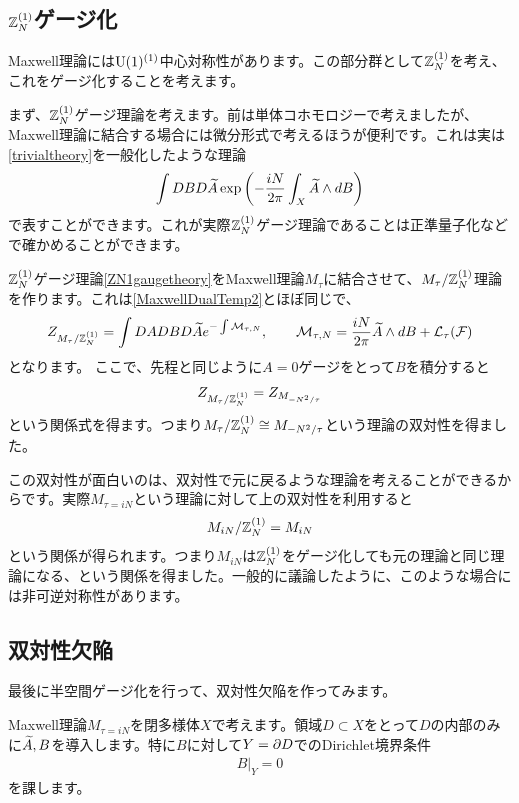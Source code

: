 \documentclass[generalized_symmetry.tex]{subfiles}
\begin{document}
\subsection{\texorpdfstring{$\mathbb{Z}_{N}^{(1)}$}{ZN1}ゲージ化}

Maxwell理論には$\mbox{U}(1)^{(1)}$中心対称性があります。この部分群として$\mathbb{Z}_N^{(1)}$を考え、これをゲージ化することを考えます。

まず、$\mathbb{Z}_N^{(1)}$ゲージ理論を考えます。前は単体コホモロジーで考えましたが、Maxwell理論に結合する場合には微分形式で考えるほうが便利です。これは実は\eqref{trivialtheory}を一般化したような理論
\begin{align}
  \int DB D\widetilde{A} \exp\left(-\frac{iN}{2\pi}\int_{X} \widetilde{A} \wedge dB\right)
    \label{ZN1gaugetheory}
\end{align}
で表すことができます。これが実際$\mathbb{Z}_N^{(1)}$ゲージ理論であることは正準量子化などで確かめることができます。

$\mathbb{Z}_N^{(1)}$ゲージ理論\eqref{ZN1gaugetheory}をMaxwell理論$M_{\tau}$に結合させて、$M_{\tau}/\mathbb{Z}_N^{(1)}$理論を作ります。これは\eqref{MaxwellDualTemp2}とほぼ同じで、
\begin{align}
  Z_{M_{\tau}/\mathbb{Z}_N^{(1)}}= \int DA DB D\widetilde{A} e^{-\int \mathcal{M}_{\tau,N}},\qquad \mathcal{M}_{\tau,N}=\frac{iN}{2\pi}\widetilde{A} \wedge dB+\mathcal{L}_{\tau}(\mathcal{F})\label{Maxwell/ZN}
\end{align}
となります。
ここで、先程と同じように$A=0$ゲージをとって$B$を積分すると
\begin{align}
  Z_{M_{\tau}/\mathbb{Z}_N^{(1)}}=Z_{M_{-N^2/\tau}}
\end{align}
という関係式を得ます。つまり$M_{\tau}/\mathbb{Z}_N^{(1)}\cong M_{-N^2/\tau}$という理論の双対性を得ました。

この双対性が面白いのは、双対性で元に戻るような理論を考えることができるからです。実際$M_{\tau=iN}$という理論に対して上の双対性を利用すると
\begin{align}
  M_{iN}/\mathbb{Z}_N^{(1)} = M_{iN}
\end{align}
という関係が得られます。つまり$M_{iN}$は$\mathbb{Z}_N^{(1)}$をゲージ化しても元の理論と同じ理論になる、という関係を得ました。一般的に議論したように、このような場合には非可逆対称性があります。

\subsection{双対性欠陥}

最後に半空間ゲージ化を行って、双対性欠陥を作ってみます。

Maxwell理論$M_{\tau=iN}$を閉多様体$X$で考えます。領域$D\subset X$をとって$D$の内部のみに$\widetilde{A},B$を導入します。特に$B$に対して$Y=\partial D$でのDirichlet境界条件
\begin{align}
  B|_{Y}=0
\end{align}
を課します。
\end{document}
